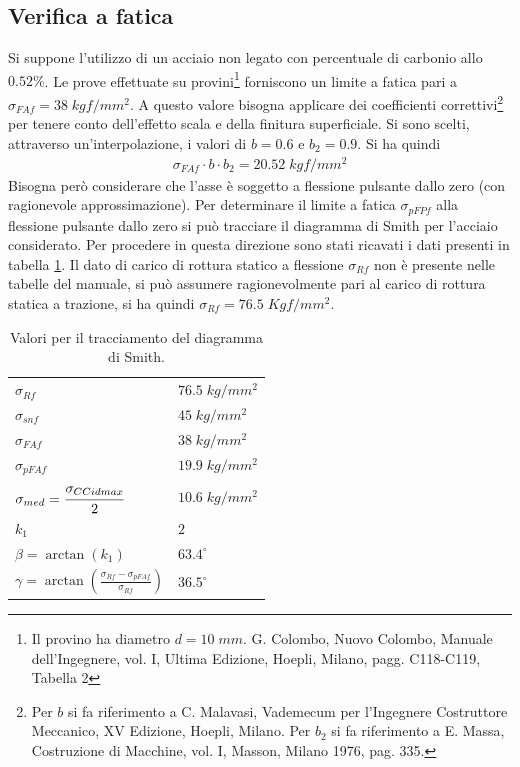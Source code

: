 \subsection{Verifica a fatica}
Si suppone l'utilizzo di un acciaio non legato con percentuale di carbonio allo $0.52\%$.
Le prove effettuate su provini\footnote{Il provino ha diametro $d=10\; mm$. G. Colombo, Nuovo Colombo, Manuale dell’Ingegnere,
vol. I, Ultima Edizione, Hoepli, Milano, pagg. C118-C119, Tabella 2} forniscono un limite a fatica pari a $\sigma_{FAf}= 38 \; kgf/mm^2$. 
A questo valore bisogna applicare dei coefficienti correttivi\footnote{Per $b$ si fa riferimento a C. Malavasi, Vademecum per l’Ingegnere Costruttore Meccanico, XV Edizione, Hoepli, Milano. Per $b_2$ si fa riferimento a E. Massa, Costruzione di Macchine, vol. I, Masson, Milano 1976, pag. 335.} per tenere conto dell'effetto scala e della finitura superficiale. 
Si sono scelti, attraverso un'interpolazione, i valori di $b=0.6$ e $b_2=0.9$.
Si ha quindi 
\begin{align*}
\sigma_{FAf} \cdot b \cdot b_2= 20.52 \; kgf/mm^2
\end{align*}
Bisogna però considerare che l'asse è soggetto a flessione pulsante dallo zero (con ragionevole approssimazione). 
Per determinare il limite a fatica $\sigma_{pFPf}$ alla flessione pulsante dallo zero si può tracciare il diagramma di Smith per l'acciaio considerato. 
Per procedere in questa direzione sono stati ricavati i dati presenti in tabella \ref{tab:smith}. Il dato di carico di rottura statico a flessione $\sigma_{Rf}$ non è presente nelle tabelle del manuale, si può assumere ragionevolmente pari al carico di rottura statica a trazione, si ha quindi $\sigma_{Rf} = 76.5 \; Kgf/mm^2$. 
\begin{table}[H]
\centering
\begin{tabular}{ll}
\toprule
$\sigma_{Rf}$                              & $76.5\;kg/mm^2$ \\
$\sigma_{snf}$                             & $45\;kg/mm^2$   \\
$\sigma_{FAf}$                             & $38\;kg/mm^2$   \\
$\sigma_{pFAf}$                            & $19.9\;kg/mm^2$ \\
$\sigma_{med}= \cfrac{\sigma_{CCidmax}}{2}$ & $10.6\;kg/mm^2$ \\
$k_1$                                      & $2$             \\
$\beta=\arctan (k_1)$                      & $63.4^{\circ}$  \\
$\gamma = \arctan \left(\frac{\sigma_{Rf} - \sigma_{pFAf}}{\sigma_{Rf}}\right)$                                   & $36.5^{\circ}$ \\
\bottomrule
\end{tabular}
\caption{Valori per il tracciamento del diagramma di Smith.}
\label{tab:smith}
\end{table}
